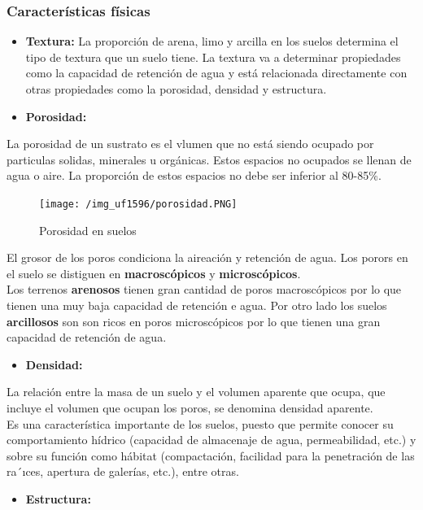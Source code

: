 \documentclass[a4paper,12pt,oneside]{article}
\begin{document}
\subsubsection{Características físicas}
\label{sec:org9e53e54}
\begin{itemize}
\item \textbf{Textura:} La proporción de arena, limo y arcilla en los suelos determina el
tipo de textura que un suelo tiene. La textura va a determinar propiedades
como la capacidad de retención de agua y está relacionada directamente con
otras propiedades como la porosidad, densidad y estructura.
\item \textbf{Porosidad:}
\end{itemize}
La porosidad de un sustrato es el vlumen que no está siendo ocupado por
particulas solidas, minerales u orgánicas. Estos espacios no ocupados se llenan
de agua o aire.
La proporción de estos espacios no debe ser inferior al 80-85\%.\\
\begin{center}
\begin{figure}[htbp]
\centering
\texttt{[image: /img\_uf1596/porosidad.PNG]}
\caption{\label{fig:org977db36}
Porosidad en suelos}
\end{figure}
\end{center}
El grosor de los poros condiciona la aireación y retención de agua. Los porors
en el suelo se distiguen en \textbf{macroscópicos} y \textbf{microscópicos}.\\
Los terrenos \textbf{arenosos} tienen gran cantidad de poros macroscópicos por lo que tienen una 
muy baja capacidad de retención e agua. Por otro lado los suelos \textbf{arcillosos}
son son ricos en poros microscópicos por lo que tienen una gran capacidad de
retención de agua.
\begin{itemize}
\item \textbf{Densidad:}
\end{itemize}
La relación entre la masa de un suelo y el volumen aparente que ocupa, que
incluye el volumen que ocupan los poros, se denomina densidad aparente.\\
 Es una característica importante de los suelos, puesto que permite conocer su
comportamiento hídrico (capacidad de almacenaje de agua, permeabilidad, etc.) y
sobre su función como hábitat (compactación, facilidad para la penetración de
las ra´ıces, apertura de galerías, etc.), entre otras.
\begin{itemize}
\item \textbf{Estructura:}
\end{itemize}
\end{document}
